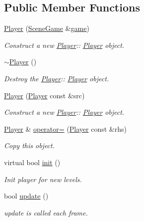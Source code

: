 \subsection*{Public Member Functions}
\begin{DoxyCompactItemize}
\item 
\hyperlink{class_player_a290433592841cca95046b8c9dac7be86}{Player} (\hyperlink{class_scene_game}{Scene\+Game} \&\hyperlink{class_a_entity_aa2c05db944a8b7487eb8470dd20211ab}{game})
\begin{DoxyCompactList}\small\item\em Construct a new \hyperlink{class_player}{Player}\+:\+: \hyperlink{class_player}{Player} object. \end{DoxyCompactList}\item 
\mbox{\label{class_player_a749d2c00e1fe0f5c2746f7505a58c062}} 
\hyperlink{class_player_a749d2c00e1fe0f5c2746f7505a58c062}{$\sim$\+Player} ()
\begin{DoxyCompactList}\small\item\em Destroy the \hyperlink{class_player}{Player}\+:\+: \hyperlink{class_player}{Player} object. \end{DoxyCompactList}\item 
\hyperlink{class_player_a2cf4315d62d84ddf41d86d76a9bb9294}{Player} (\hyperlink{class_player}{Player} const \&src)
\begin{DoxyCompactList}\small\item\em Construct a new \hyperlink{class_player}{Player}\+:\+: \hyperlink{class_player}{Player} object. \end{DoxyCompactList}\item 
\hyperlink{class_player}{Player} \& \hyperlink{class_player_a32a02cfee10a8ba8ccfa4cd0244cb42f}{operator=} (\hyperlink{class_player}{Player} const \&rhs)
\begin{DoxyCompactList}\small\item\em Copy this object. \end{DoxyCompactList}\item 
virtual bool \hyperlink{class_player_afcf86538719baa2f5c81d0b90263c41a}{init} ()
\begin{DoxyCompactList}\small\item\em Init player for new levels. \end{DoxyCompactList}\item 
bool \hyperlink{class_player_a1614c89caa50fa1527417ba6a2bbe6ee}{update} ()
\begin{DoxyCompactList}\small\item\em update is called each frame. \end{DoxyCompactList}\item 

\end{DoxyCompactItemize}
